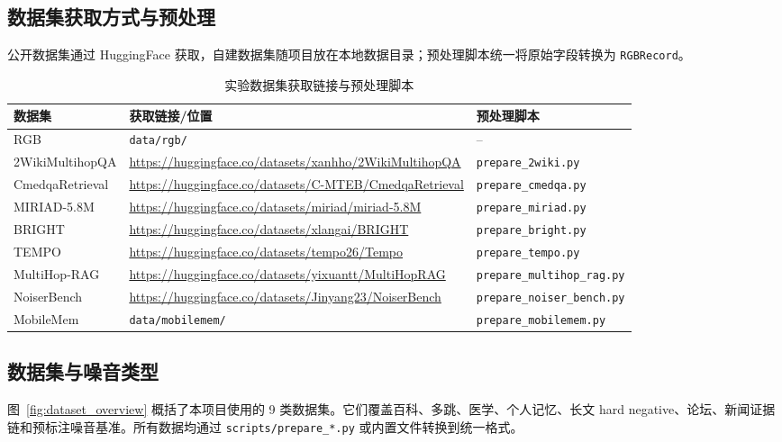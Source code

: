 \documentclass[UTF8,zihao=-4]{ctexart}
\begin{document}
\subsection{数据集获取方式与预处理}

公开数据集通过 HuggingFace 获取，自建数据集随项目放在本地数据目录；预处理脚本统一将原始字段转换为 \texttt{RGBRecord}。

\begin{table}[htbp]
  \centering
  \caption{实验数据集获取链接与预处理脚本}
  \footnotesize
  \begin{tabularx}{\textwidth}{lYY}
    \toprule
    数据集 & 获取链接/位置 & 预处理脚本 \\
    \midrule
    RGB & \texttt{data/rgb/} & -- \\
    2WikiMultihopQA & \url{https://huggingface.co/datasets/xanhho/2WikiMultihopQA} & \texttt{prepare\_2wiki.py} \\
    CmedqaRetrieval & \url{https://huggingface.co/datasets/C-MTEB/CmedqaRetrieval} & \texttt{prepare\_cmedqa.py} \\
    MIRIAD-5.8M & \url{https://huggingface.co/datasets/miriad/miriad-5.8M} & \texttt{prepare\_miriad.py} \\
    BRIGHT & \url{https://huggingface.co/datasets/xlangai/BRIGHT} & \texttt{prepare\_bright.py} \\
    TEMPO & \url{https://huggingface.co/datasets/tempo26/Tempo} & \texttt{prepare\_tempo.py} \\
    MultiHop-RAG & \url{https://huggingface.co/datasets/yixuantt/MultiHopRAG} & \texttt{prepare\_multihop\_rag.py} \\
    NoiserBench & \url{https://huggingface.co/datasets/Jinyang23/NoiserBench} & \texttt{prepare\_noiser\_bench.py} \\
    MobileMem & \texttt{data/mobilemem/} & \texttt{prepare\_mobilemem.py} \\
    \bottomrule
  \end{tabularx}
\end{table}

\subsection{数据集与噪音类型}

图~\ref{fig:dataset_overview} 概括了本项目使用的 9 类数据集。它们覆盖百科、多跳、医学、个人记忆、长文 hard negative、论坛、新闻证据链和预标注噪音基准。所有数据均通过 \texttt{scripts/prepare\_*.py} 或内置文件转换到统一格式。
\end{document}
